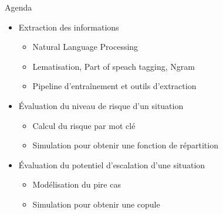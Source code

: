 \begin{frame}[label=intro]{Agenda}
	\begin{itemize}
		\item Extraction des informations
		\begin{itemize}
			\item Natural Language Processing
			\item Lematisation, Part of speach tagging, Ngram 
			\item Pipeline d'entraînement et outils d'extraction
		\end{itemize}
		\item Évaluation du niveau de risque d'un situation
		\begin{itemize}
			\item Calcul du risque par mot clé
			\item Simulation pour obtenir une fonction de répartition
		\end{itemize}
		
		\item Évaluation du potentiel d'escalation d'une situation
			\begin{itemize}
				\item Modélisation du pire cas
				\item Simulation pour obtenir une copule 
			\end{itemize}
	\end{itemize}
\end{frame}









